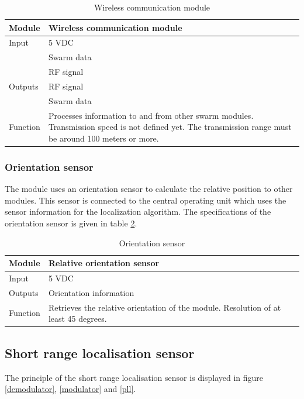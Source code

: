 \documentclass[10pt,a4paper]{article}
\begin{document}
\begin{table}[H]
\centering
\caption{Wireless communication module}
\label{wcm}
\begin{tabular}{|p{}|p{}|}
\hline
Module   & Wireless communication module                                       \\ \hline
Input    & 5 VDC\\ 
        & Swarm data\\
        & RF signal                                              \\ \hline
Outputs  & RF signal                                           \\ 
& Swarm data \\ \hline
Function & Processes information to and from other swarm modules. Transmission speed is not defined yet. The transmission range must be around 100 meters or more. \\ \hline
\end{tabular}
\end{table}

\subsubsection{Orientation sensor}
The module uses an orientation sensor to calculate the relative position to other modules. This sensor is connected to the central operating unit which uses the sensor information for the localization algorithm. The specifications of the orientation sensor is given in table \ref{orisensor}.

\begin{table}[H]
\centering
\caption{Orientation sensor}
\label{orisensor}
\begin{tabular}{|p{}|p{}|}
\hline
Module   & Relative orientation sensor                                        \\ \hline
Input    & 5 VDC                                             \\ \hline
Outputs  & Orientation information                                           \\ \hline
Function & Retrieves the relative orientation of the module. Resolution of at least 45 degrees. \\ \hline
\end{tabular}
\end{table}


\subsection{Short range localisation sensor}
The principle of the short range localisation sensor is displayed in figure \ref{demodulator}, \ref{modulator} and \ref{pll}.
\end{document}
